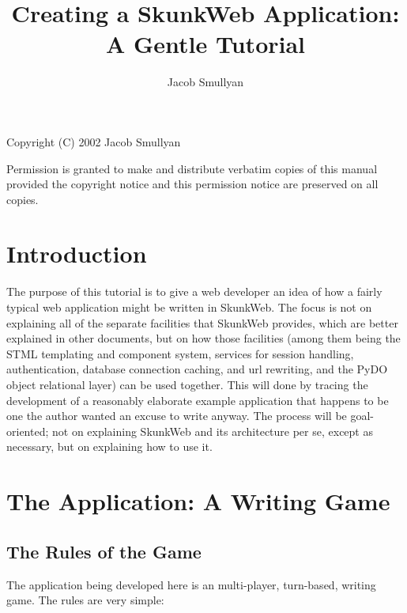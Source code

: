 \documentclass{manual}
\title{Creating a SkunkWeb Application: A Gentle Tutorial}
\author{Jacob Smullyan}
\begin{document}
\maketitle

\vfill 

\noindent
Copyright (C) 2002 Jacob Smullyan

\noindent
Permission is granted to make and distribute verbatim copies of this
manual provided the copyright notice and this permission notice are
preserved on all copies.

\tableofcontents

\chapter{Introduction}
\label{introduction}

The purpose of this tutorial is to give a web developer an idea of how
a fairly typical web application might be written in SkunkWeb. The
focus is not on explaining all of the separate facilities that
SkunkWeb provides, which are better explained in other documents, but
on how those facilities (among them being the STML templating and
component system, services for session handling, authentication,
database connection caching, and url rewriting, and the PyDO object
relational layer) can be used together.  This will done by tracing the
development of a reasonably elaborate example application that happens
to be one the author wanted an excuse to write anyway.  The process
will be goal-oriented; not on explaining SkunkWeb and its architecture
per se, except as necessary, but on explaining how to use it.

\chapter{The Application: A Writing Game}
\label{application}

\section{The Rules of the Game}

The application being developed here is an multi-player, turn-based,
writing game.  The rules are very simple:
\end{document}
